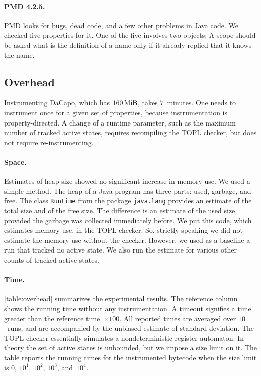 \documentclass[9pt, preprint]{sigplanconf} %
\theoremstyle{definition}
\theoremstyle{remark}
\begin{document}
\paragraph{PMD 4.2.5.}
PMD looks for bugs, dead code, and a few other problems in Java code.
We checked five properties for it.
One of the five involves two objects:
A scope should be asked what is the definition of a name only if it already replied that it knows the name.

\subsection{Overhead} %

Instrumenting DaCapo, which has $160\rm\,MiB$, takes $7$~minutes.
One needs to instrument once for a given set of properties, because instrumentation is property-directed.
A change of a runtime parameter, such as the maximum number of tracked active states, requires recompiling the TOPL checker, but does not require re-instrumenting.

\paragraph{Space.}
Estimates of heap size showed no significant increase in memory use.
We used a simple method.
The heap of a Java program has three parts: used, garbage, and free.
The class {\tt Runtime} from the package {\tt java.lang} provides an estimate of the total size and of the free size.
The difference is an estimate of the used size, provided the garbage was collected immediately before.
We put this code, which estimates memory use, in the TOPL checker.
So, strictly speaking we did not estimate the memory use without the checker.
However, we used as a baseline a run that tracked no active state.
We also run the estimate for various other counts of tracked active states.

\paragraph{Time.}
\autoref{table:overhead} summarizes the experimental results.
The reference column shows the running time without any instrumentation.
A timeout signifies a time greater than the reference time~$\times100$.
All reported times are averaged over $10$~runs, and are accompanied by the unbiased estimate of standard deviation.
The TOPL checker essentially simulates a nondeterministic register automaton.
In theory the set of active states is unbounded, but we impose a size limit on it.
The table reports the running times for the instrumented bytecode when the size limit is $0$, $10^1$, $10^2$, $10^3$, and~$10^4$.
\end{document}
